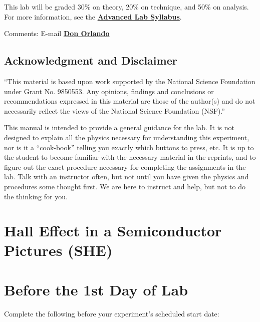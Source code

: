 \documentclass{../lab}
\begin{document}
\noindent This lab will be graded 30\% on theory, 20\% on technique, and 50\% on analysis. For more information, see the \href{\AdvancedLabSyllabus}{\textbf{Advanced Lab Syllabus}}.

Comments: E-mail \href{\MailDonOrlando}{\textbf{Don Orlando}}

\subsection{Acknowledgment and Disclaimer}

``This material is based upon work supported by the National Science Foundation under Grant No. 9850553. Any opinions, findings and conclusions or recommendations expressed in this material are those of the author(s) and do not necessarily reflect the views of the National Science Foundation (NSF).''

This manual is intended to provide a general guidance for the lab. It is not designed to explain all the physics necessary for understanding this experiment, nor is it a ``cook-book'' telling you exactly which buttons to press, etc. It is up to the student to become familiar with the necessary material in the reprints, and to figure out the exact procedure necessary for completing the assignments in the lab. Talk with an instructor often, but not until you have given the physics and procedures some thought first. We are here to instruct and help, but not to do the thinking for you.

\section{Hall Effect in a Semiconductor Pictures (SHE)}

\section{Before the 1st Day of Lab}

Complete the following before your experiment's scheduled start date:
\end{document}
